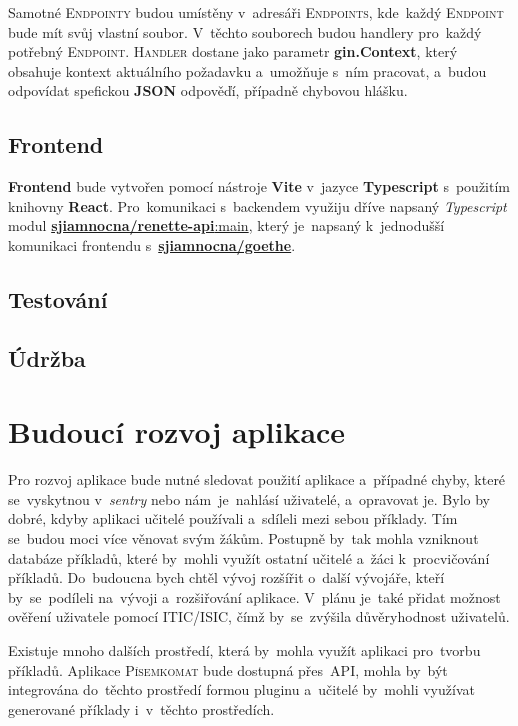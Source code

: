 \documentclass[14pt,a4paper]{article}
\begin{document}
            Samotné \textsc{Endpointy} budou umístěny v~adresáři \textsc{Endpoints}, kde~každý \textsc{Endpoint} bude mít svůj vlastní soubor. V~těchto souborech budou handlery pro~každý potřebný \textsc{Endpoint}. \textsc{Handler} dostane jako parametr \textbf{gin.Context}, který obsahuje kontext aktuálního požadavku a~umožňuje s~ním pracovat, a~budou odpovídat spefickou \textbf{JSON} odpověďí, případně chybovou hlášku.

        \subsection{Frontend}
            \textbf{Frontend} bude vytvořen pomocí nástroje \textbf{Vite} v~jazyce \textbf{Typescript} s~použitím knihovny \textbf{React}. Pro~komunikaci s~backendem využiju dříve napsaný \emph{Typescript} modul \href{https://gitlab.com/sjiamnocna/renette-api}{\textbf{sjiamnocna/renette-api}:main}, který je~napsaný k~jednodušší komunikaci frontendu s~\href{https://gitlab.com/sjiamnocna/goethe}{\textbf{sjiamnocna/goethe}}.
        \subsection{Testování}
        \subsection{Údržba}
        
	\section{Budoucí rozvoj aplikace}
        Pro rozvoj aplikace bude nutné sledovat použití aplikace a~případné chyby, které se~vyskytnou v~\emph{sentry} nebo nám~je~nahlásí uživatelé, a~opravovat je.
        Bylo by dobré, kdyby aplikaci učitelé používali a~sdíleli mezi sebou příklady. Tím se~budou moci více věnovat svým žákům. Postupně by~tak mohla vzniknout databáze příkladů, které by~mohli využít ostatní učitelé a~žáci k~procvičování příkladů.
        Do~budoucna bych chtěl vývoj rozšířit o~další vývojáře, kteří by~se~podíleli na~vývoji a~rozšiřování aplikace. V~plánu je~také přidat možnost ověření uživatele pomocí ITIC/ISIC, čímž by~se~zvýšila důvěryhodnost uživatelů.
        
        Existuje mnoho dalších prostředí, která by~mohla využít aplikaci pro~tvorbu příkladů. Aplikace \textsc{Písemkomat} bude dostupná přes~\textsc{API}, mohla by~být integrována do~těchto prostředí formou pluginu a~učitelé by~mohli využívat generované příklady i~v~těchto prostředích.
        
\end{document}
